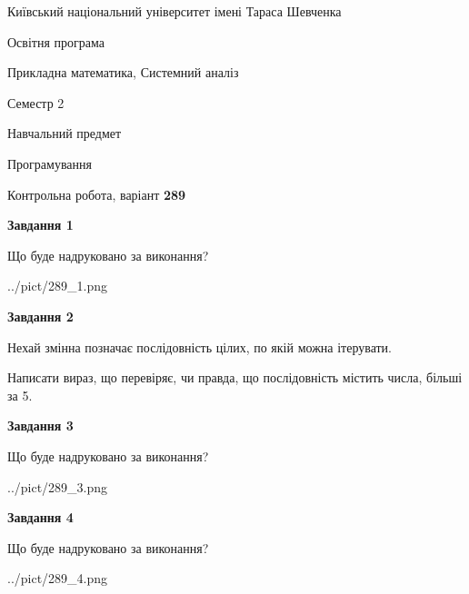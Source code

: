 \documentclass[12pt, ukrainian]{article}
\begin{document}
{{\begin {small}\par
{ \center  Київський національний університет імені Тараса Шевченка \par}
{\parbox {5 cm}{Освітня програма \hfill}{\parbox {8 cm}{Прикладна математика, Системний аналіз \hfill}}\parbox {5 cm}{\hfill Семестр 2}}\par
{\parbox {5 cm} {Навчальний предмет \hfill}\parbox {7 cm}{Програмування \hfill}\parbox {6cm}{\hfill}\par}\vspace{-7pt} \end{small}}{\center Контрольна робота, варіант  \No \textbf
{ 289 }\par}}
{
\begin {large}
{\begin {center}\textbf{Завдання 1}\end {center}}\par
Що буде надруковано за виконання?\par\par
\begin{center}
	{../pict/289_1.png}
\end{center}
\newpage

{\begin {center}\textbf{Завдання 2}\end {center}}\par
Нехай змінна  позначає послідовність цілих, по якій можна ітерувати.

Написати вираз, що перевіряє, чи правда, що послідовність  містить числа, більші за 5.\par
\newpage

{\begin {center}\textbf{Завдання 3}\end {center}}\par
Що буде надруковано за виконання?\par
\begin{center}
	{../pict/289_3.png}
\end{center}
\newpage

{\begin {center}\textbf{Завдання 4}\end {center}}\par
Що буде надруковано за виконання?\par
\begin{center}
	{../pict/289_4.png}
\end{center}
\newpage


\end{large}}
\end{document}
